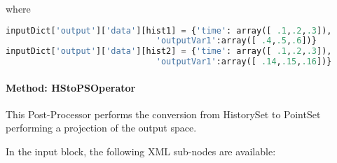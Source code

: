 where

\begin{lstlisting}[language=python]
inputDict['output']['data'][hist1] = {'time': array([ .1,.2,.3]),
                              'outputVar1':array([ .4,.5,.6])}
inputDict['output']['data'][hist2] = {'time': array([ .1,.2,.3]),
                              'outputVar1':array([ .14,.15,.16])}
\end{lstlisting}


\paragraph{Method: HStoPSOperator}

This Post-Processor performs the conversion from HistorySet to PointSet performing a projection of the output space.

In the  input block, the following XML sub-nodes are available:

